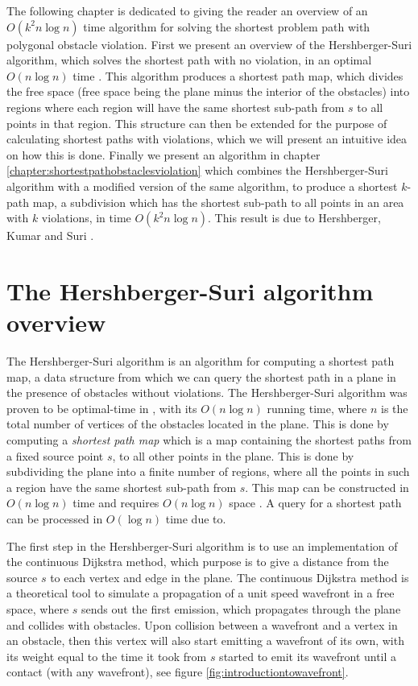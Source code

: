 The following chapter is dedicated to giving the reader an overview of an $O(k^2 n \log n)$ 
time algorithm for solving the shortest problem path with polygonal obstacle violation. First we present an 
overview of the Hershberger-Suri algorithm, which solves the shortest path with no violation, 
in an optimal $O(n \log n)$ time \cite{HershbergerS99}. This algorithm produces a shortest 
path map, which divides the free space (free space being the plane minus the interior of the 
obstacles) into regions where each region will have the same shortest sub-path from $s$ to 
all points in that region. This structure can then be extended for the purpose of calculating 
shortest paths with violations, which we will present an intuitive idea on how this is done. 
Finally we present an algorithm in chapter \ref{chapter:shortestpathobstaclesviolation} which
combines the Hershberger-Suri algorithm with a modified version of the same algorithm, 
to produce a shortest $k$-path map, a subdivision 
which has the shortest sub-path to all points in an area with $k$ violations, in time $O(k^2 
n \log n)$. This result is due to Hershberger, Kumar and Suri \cite{HershbergerKS17}.

\section{The Hershberger-Suri algorithm overview}

The Hershberger-Suri algorithm is an algorithm for computing a shortest path map, a
data structure from which we can query the shortest path in a plane in the presence of 
obstacles without violations. The Hershberger-Suri algorithm was proven to be optimal-time 
in \cite{HershbergerS99}, with its $O(n \log n)$ running time, where $n$ is the total number of vertices 
of the obstacles located in the plane. This is done by computing a \emph{shortest path map} 
which is  a map containing the shortest paths from a fixed source point $s$, to all 
other points in the plane. This is done by subdividing the plane into a finite number
of regions, where all the points in such a region have the same shortest sub-path
from $s$. This map can be constructed in $O(n\log n)$ time and requires $O(n\log n)$ 
space \cite{HershbergerS99}. A query for a shortest path can be processed in $O(\log n)$
time due to\cite{DBLP:journals/siamcomp/Kirkpatrick83}. 

The first step in the Hershberger-Suri algorithm is to use an implementation of
the continuous Dijkstra method, which purpose is to give a distance from the
source $s$ to each vertex and edge in the plane. The continuous Dijkstra method
is a theoretical tool to simulate a propagation of a unit speed wavefront in a
free space, where $s$ sends out the first emission, which propagates through
the plane and collides with obstacles. Upon collision between a wavefront and
a vertex in an obstacle, then this vertex will also start emitting a wavefront
of its own, with its weight equal to the time it took from $s$ started to emit
its wavefront until a contact (with any wavefront), see figure \ref{fig:introductiontowavefront}. 

